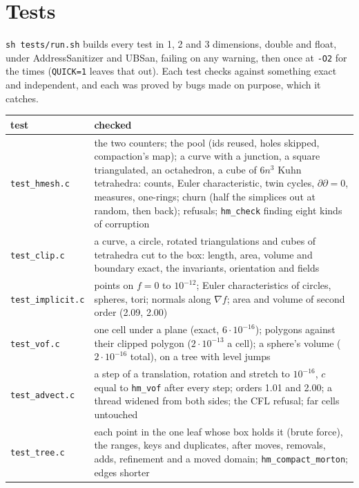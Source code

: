 \documentclass[10pt,a4paper]{article}
\theoremstyle{definition}
\newcommand{\fn}[1]{\texttt{#1}}
\begin{document}
\section{Tests}
\label{sec:tests}

\fn{sh tests/run.sh} builds every test in 1, 2 and 3 dimensions, double and
float, under AddressSanitizer and UBSan, failing on any warning, then once
at \fn{-O2} for the times (\fn{QUICK=1} leaves that out). Each test checks
against something exact and independent, and each was proved by bugs made
on purpose, which it catches.

\begin{center}
\begin{tabularx}{\textwidth}{@{}>{\raggedright}p{}X@{}}
  \toprule
  test & checked \\
  \midrule
  \fn{test\_hmesh.c} & the two counters; the pool (ids reused, holes
    skipped, compaction's map); a curve with a junction, a square
    triangulated, an octahedron, a cube of $6 n^3$ Kuhn tetrahedra: counts,
    Euler characteristic, twin cycles, $\partial \partial = 0$, measures,
    one-rings; churn (half the simplices out at random, then back);
    refusals; \fn{hm\_check} finding eight kinds of corruption \\
  \fn{test\_clip.c} & a curve, a circle, rotated triangulations and cubes of
    tetrahedra cut to the box: length, area, volume and boundary exact, the
    invariants, orientation and fields \\
  \fn{test\_implicit.c} & points on $f = 0$ to $10^{-12}$; Euler
    characteristics of circles, spheres, tori; normals along $\nabla f$;
    area and volume of second order (2.09, 2.00) \\
  \fn{test\_vof.c} & one cell under a plane (exact, $6 \cdot 10^{-16}$);
    polygons against their clipped polygon ($2 \cdot 10^{-13}$ a cell); a
    sphere's volume ($2 \cdot 10^{-16}$ total), on a tree with level jumps \\
  \fn{test\_advect.c} & a step of a translation, rotation and stretch to
    $10^{-16}$, $c$ equal to \fn{hm\_vof} after every step; orders 1.01 and
    2.00; a thread widened from both sides; the CFL refusal; far cells
    untouched \\
  \fn{test\_tree.c} & each point in the one leaf whose box holds it (brute
    force), the ranges, keys and duplicates, after moves, removals, adds,
    refinement and a moved domain; \fn{hm\_compact\_morton}; edges shorter

\end{tabularx}
\end{center}
\end{document}
